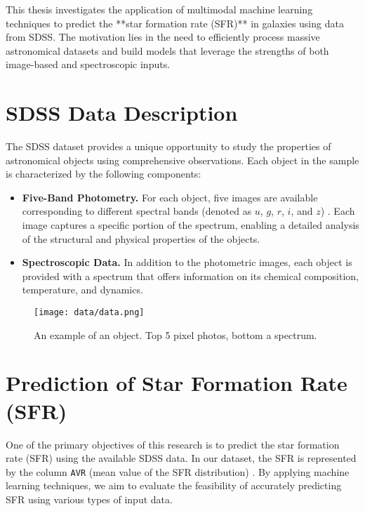 \documentclass[english,bachelor,oneside]{ctufit-thesis}
\begin{document}
This thesis investigates the application of multimodal machine learning techniques to predict the **star formation rate (SFR)** \cite{lopes2021effects} in galaxies using data from SDSS. The motivation lies in the need to efficiently process massive astronomical datasets and build models that leverage the strengths of both image-based and spectroscopic inputs.

\section{SDSS Data Description}

The SDSS dataset provides a unique opportunity to study the properties of astronomical objects using comprehensive observations. Each object in the sample is characterized by the following components:
\begin{itemize}
    \item \textbf{Five-Band Photometry.} For each object, five images are available corresponding to different spectral bands (denoted as \(u\), \(g\), \(r\), \(i\), and \(z\)) \cite{fukugita1996sloan}. Each image captures a specific portion of the spectrum, enabling a detailed analysis of the structural and physical properties of the objects.
    \item \textbf{Spectroscopic Data.} In addition to the photometric images, each object is provided with a spectrum that offers information on its chemical composition, temperature, and dynamics.
\end{itemize}

\begin{figure}[h]
    \centering
    \texttt{[image: data/data.png]}
    \caption{An example of an object. Top 5 pixel photos, bottom a spectrum.}
    \label{fig:prism}
\end{figure}

\section{Prediction of Star Formation Rate (SFR)}

One of the primary objectives of this research is to predict the star formation rate (SFR) using the available SDSS data. In our dataset, the SFR is represented by the column \texttt{AVR} (mean value of the SFR distribution) \cite{Rawdata46:online}. By applying machine learning techniques, we aim to evaluate the feasibility of accurately predicting SFR using various types of input data.
\end{document}
